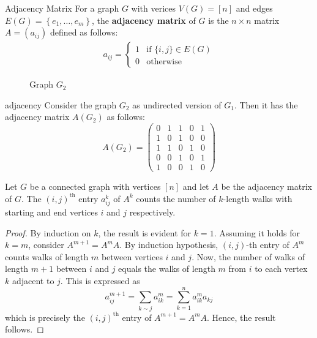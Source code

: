 \documentclass[../basic_graph_theory.tex]{subfiles}
\begin{document}
\begin{Def}{}{Adjacency Matrix}
  For a graph $G$ with verices $V(G) = [n]$ and edges $E(G) = \left\{ e_1, \dots, e_m \right\}$, the \textbf{adjacency matrix} of $G$ is the $n \times n$ matrix $A = (a_{ij})$ defined as follows:
  \begin{align*}
    a_{ij} = \begin{cases}
               1 & \text{if } \{i, j\} \in E(G) \\
               0 & \text{otherwise}
             \end{cases}
  \end{align*}
\end{Def}

\begin{figure}[ht]
  \centering
  \label{fig:adjacency}
  \caption{Graph $G_2$}
\end{figure}

\begin{Eg}{}{adjacency}
  Consider the graph $ G_2 $ as undirected version of \(G_1\). Then it has the adjacency matrix $ A(G_2) $ as follows:
  \[
    A(G_2) = \begin{pmatrix}
      0 & 1 & 1 & 0 & 1 \\
      1 & 0 & 1 & 0 & 0 \\
      1 & 1 & 0 & 1 & 0 \\
      0 & 0 & 1 & 0 & 1 \\
      1 & 0 & 0 & 1 & 0
    \end{pmatrix}
  \]
\end{Eg}

\begin{Thm}{}{}
  Let \(G\) be a connected graph with vertices \([n]\) and let \(A\) be the adjacency matrix of \(G\). The \((i,j)^{\text{th}}\) entry \(a_{ij}^k\) of \(A^k\) counts the number of \(k\)-length walks with starting and end vertices \(i\) and \(j\) respectively.
\end{Thm}
\begin{proof}
  By induction on \(k\), the result is evident for \(k = 1\). Assuming it holds for \(k = m\), consider \(A^{m+1} = A^m A\). By induction hypothesis, \((i,j)\)-th entry of \(A^m\) counts walks of length \(m\) between vertices \(i\) and \(j\). Now, the number of walks of length \(m + 1\) between \(i\) and \(j\) equals the walks of length \(m\) from \(i\) to each vertex \(k\) adjacent to \(j\). This is expressed as
  \[
    a_{ij}^{m+1} = \sum_{k \sim j} a_{ik}^m = \sum_{k = 1}^{n} a^m_{ik} a_{kj}
  \]
  which is precisely the \((i,j)^{\text{th}}\) entry of \(A^{m+1} = A^m A\). Hence, the result follows.
\end{proof}
\end{document}
